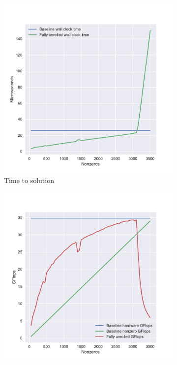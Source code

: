   \begin{figure}[H]
    \centering
    \begin{subfigure}[l]{0.48\textwidth}
      \centering
      \includegraphics[width=\textwidth]{images/unrolled_scaling_time.pdf}
      \caption{Time to solution}
      \label{fig:unrolled_time}
    \end{subfigure}
    \begin{subfigure}[r]{0.48\textwidth}
      \centering
      \includegraphics[width=\textwidth]{images/unrolled_scaling_flops.pdf}

\end{subfigure}
\end{figure}

